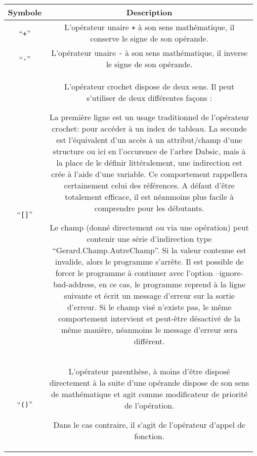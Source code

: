 \documentclass[a5paper, 12pt]{book}
\begin{document}
\begin{tabular}{c|c}
  \hline
  Symbole & Description\\
  \hline
  ``\verb!+!'' & L'opérateur unaire \verb!+! à son sens mathématique, il conserve le signe de son opérande.\\
  ``\verb!-!'' & L'opérateur unaire \verb!-! à son sens mathématique, il inverse le signe de son opérande.\\
  ``\verb![]!'' & L'opérateur crochet dispose de deux sens. Il peut s'utiliser de deux différentes façons :
%        
  
  La première ligne est un usage traditionnel de l'opérateur crochet: pour accéder à un index
  de tableau.
  La seconde est l'équivalent d'un accès à un attribut/champ d'une structure ou ici en
  l'occurence de l'arbre Dabsic, mais à la place de le définir littéralement, une
  indirection est crée à l'aide d'une variable.
  Ce comportement rappellera certainement celui des références. A défaut d'être totalement
  efficace, il est néanmoins plus facile à comprendre pour les débutants.

  Le champ (donné directement ou via une opération) peut contenir une série
  d'indirection type ``Gerard.Champ.AutreChamp''. Si la valeur contenue
  est invalide, alors le programme s'arrête. Il est possible de forcer
  le programme à continuer avec l'option --ignore-bad-address, en ce cas,
  le programme reprend à la ligne suivante et écrit un message d'erreur
  sur la sortie d'erreur.
  Si le champ visé n'existe pas, le même comportement intervient et
  peut-être désactivé de la même manière, néanmoins le message d'erreur
  sera différent.
  \\
  ``\verb!()!'' & L'opérateur parenthèse, à moins d'être disposé directement à la suite d'une opérande
  dispose de son sens de mathématique et agit comme modificateur de priorité de l'opération.
  
  Dans le cas contraire, il s'agit de l'opérateur d'appel de fonction.
  

\end{tabular}
\end{document}
